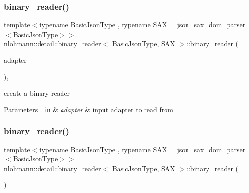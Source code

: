 \subsubsection{\texorpdfstring{binary\_reader()}{binary\_reader()}\hspace{0.1cm}{\footnotesize\ttfamily [1/3]}}
{\footnotesize\ttfamily template$<$typename Basic\+Json\+Type , typename S\+AX  = json\+\_\+sax\+\_\+dom\+\_\+parser$<$\+Basic\+Json\+Type$>$$>$ \\
\mbox{\hyperlink{classnlohmann_1_1detail_1_1binary__reader}{nlohmann\+::detail\+::binary\+\_\+reader}}$<$ Basic\+Json\+Type, S\+AX $>$\+::\mbox{\hyperlink{classnlohmann_1_1detail_1_1binary__reader}{binary\+\_\+reader}} (\begin{DoxyParamCaption}\item[{\mbox{\hyperlink{namespacenlohmann_1_1detail_ae132f8cd5bb24c5e9b40ad0eafedf1c2}{input\+\_\+adapter\+\_\+t}}}]{adapter }\end{DoxyParamCaption})\hspace{0.3cm}{\ttfamily [inline]}, {\ttfamily [explicit]}}



create a binary reader 


\begin{DoxyParams}[1]{Parameters}
\mbox{\texttt{ in}}  & {\em adapter} & input adapter to read from \\
\hline
\end{DoxyParams}
\mbox{\label{classnlohmann_1_1detail_1_1binary__reader_aacbece7dfa1698dfb3f22c90922d7244}} 
\subsubsection{\texorpdfstring{binary\_reader()}{binary\_reader()}\hspace{0.1cm}{\footnotesize\ttfamily [2/3]}}
{\footnotesize\ttfamily template$<$typename Basic\+Json\+Type , typename S\+AX  = json\+\_\+sax\+\_\+dom\+\_\+parser$<$\+Basic\+Json\+Type$>$$>$ \\
\mbox{\hyperlink{classnlohmann_1_1detail_1_1binary__reader}{nlohmann\+::detail\+::binary\+\_\+reader}}$<$ Basic\+Json\+Type, S\+AX $>$\+::\mbox{\hyperlink{classnlohmann_1_1detail_1_1binary__reader}{binary\+\_\+reader}} (\begin{DoxyParamCaption}\item[{const \mbox{\hyperlink{classnlohmann_1_1detail_1_1binary__reader}{binary\+\_\+reader}}$<$ Basic\+Json\+Type, S\+AX $>$ \&}]{ }\end{DoxyParamCaption})\hspace{0.3cm}{\ttfamily [delete]}}

